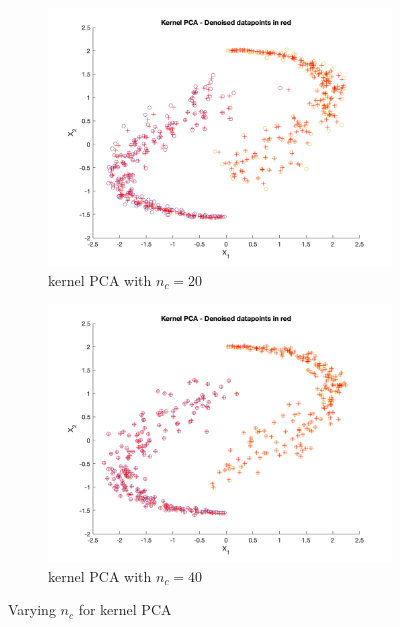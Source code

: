 \documentclass[a4paper, 11pt, one column]{article}
\begin{document}
\begin{figure}[H]
\begin{subfigure}{0.45\linewidth}
            \includegraphics[width=\linewidth]{images/kernel_pca_20comps.png}
            \caption{kernel PCA with $n_c = 20$}
        \end{subfigure}
        \begin{subfigure}{0.45\linewidth}
            \includegraphics[width=\linewidth]{images/kernel_pca_40comps.png}
            \caption{kernel PCA with $n_c = 40$}
        \end{subfigure}
        \caption{Varying $n_c$ for kernel PCA}
        \label{fig:kernelPCAvarious}
\end{figure}
\end{document}
